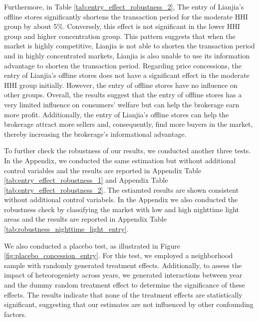 \documentclass[11pt]{article}
\begin{document}
Furthermore, in Table \ref{tab:entry_effect_robustness_2}, The entry of Lianjia's offline stores significantly shortens the transaction period for the moderate HHI group by about 5\%. Conversely, this effect is not significant in the lower HHI group and higher concentration group. This pattern suggests that when the market is highly competitive, Lianjia is not able to shorten the transaction period and in highly concentrated markets, Lianjia is also unable to use its information advantage to shorten the transaction period. Regarding price concessions, the entry of Lianjia's offline stores does not have a significant effect in the moderate HHI group initially. However, the entry of offline stores have no influence on other groups. Overall, the results suggest that the entry of offline stores has a very limited influence on consumers' welfare but can help the brokerage earn more profit. Additionally, the entry of Lianjia's offline stores can help the brokerage attract more sellers and, consequently, find more buyers in the market, thereby increasing the brokerage's informational advantage. 

To further check the robustness of our results, we conducted another three tests. In the Appendix, we conducted the same estimation but without additional control variables and the results are reported in Appendix Table \ref{tab:entry_effect_robustness_1} and Appendix Table \ref{tab:entry_effect_robustness_2}. The estiamted results are shown consistent without additional control variabels. In the Appendix we also conducted the robustness check by classifying the market with low and high nighttime light areas and the results are reported in Appendix Table \ref{tab:robustness_nighttime_light_entry}.

We also conducted a placebo test, as illustrated in Figure \ref{fig:placebo_concession_entry}. For this test, we employed a neighborhood sample with randomly generated treatment effects. Additionally, to assess the impact of heteorogeniety across years, we generated interactions between year and the dummy random treatment effect to determine the significance of these effects. The results indicate that none of the treatment effects are statistically significant, suggesting that our estimates are not influenced by other confounding factors.
\end{document}
